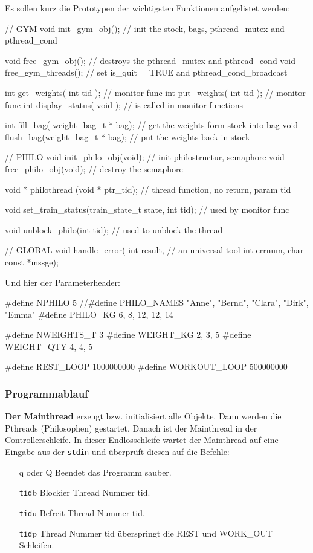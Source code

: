 \documentclass[
   draft=false
  ,paper=a4
  ,twoside=false
  ,fontsize=11pt
  ,headsepline
  ,BCOR10mm
  ,DIV11
  ,parskip=full+
]{scrartcl} %
\begin{document}
Es sollen kurz die Prototypen der wichtigsten Funktionen aufgelistet werden:
\begin{ccode}
//     GYM
void init_gym_obj();  // init the stock, bags, pthread_mutex and pthread_cond

void free_gym_obj();  // destroys the pthread_mutex and pthread_cond
void free_gym_threads(); //  set is_quit = TRUE and pthread_cond_broadcast

int get_weights( int tid );  // monitor func
int put_weights( int tid );  // monitor func
int display_status( void );  // is called in monitor functions

int fill_bag( weight_bag_t * bag);  // get the weights form stock into bag
void flush_bag(weight_bag_t * bag); // put the weights back in stock

//     PHILO
void init_philo_obj(void);  // init philostructur, semaphore
void free_philo_obj(void);  // destroy the semaphore

void * philothread (void * ptr_tid); // thread function, no return, param tid

void set_train_status(train_state_t state, int tid); // used by monitor func

void unblock_philo(int tid);  // used to unblock the thread

//     GLOBAL
void handle_error(  int result,         // an universal tool
                    int errnum,
                    char const *mssge);
\end{ccode}


Und hier der Parameterheader:
\begin{ccode}
  #define NPHILO      5
  //#define PHILO_NAMES { "Anne", "Bernd", "Clara", "Dirk", "Emma" }
  #define PHILO_KG    {      6,       8,      12,     12,     14 }

  #define NWEIGHTS_T 3
  #define WEIGHT_KG  { 2, 3, 5 }
  #define WEIGHT_QTY { 4, 4, 5 }

  #define REST_LOOP   1000000000
  #define WORKOUT_LOOP 500000000
\end{ccode}


\subsubsection{Programmablauf}
\textbf{Der Mainthread} erzeugt bzw. initialisiert alle Objekte. Dann werden
die Pthreads (Philosophen) gestartet. Danach ist der Mainthread in der
Controllerschleife. In dieser Endlosschleife wartet der
Mainthread auf eine Eingabe aus der \texttt{stdin} und überprüft diesen
auf die Befehle:
\begin{enumerate}
  \item[q oder Q] Beendet das Programm sauber.
  \item[\texttt{tid}b] Blockier Thread Nummer tid.
  \item[\texttt{tid}u] Befreit Thread Nummer tid.
  \item[\texttt{tid}p] Thread Nummer tid überspringt die REST und WORK\_OUT
   Schleifen.
\end{enumerate}
\end{document}
